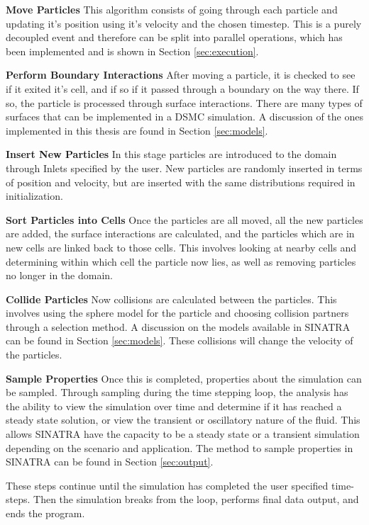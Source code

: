 \indent \textbf{Move Particles} This algorithm consists of going through each particle and updating it's position using it's velocity and the chosen timestep. This is a purely decoupled event and therefore can be split into parallel operations, which has been implemented and is shown in Section \ref{sec:execution}. \par

\indent \textbf{Perform Boundary Interactions} After moving a particle, it is checked to see if it exited it's cell, and if so if it passed through a boundary on the way there. If so, the particle is processed through surface interactions. There are many types of surfaces that can be implemented in a DSMC simulation. A discussion of the ones implemented in this thesis are found in Section \ref{sec:models}. \par

\indent \textbf{Insert New Particles} In this stage particles are introduced to the domain through Inlets specified by the user. New particles are randomly inserted in terms of position and velocity, but are inserted with the same distributions required in initialization. \par

\indent \textbf{Sort Particles into Cells} Once the particles are all moved, all the new particles are added, the surface interactions are calculated, and the particles which are in new cells are linked back to those cells. This involves looking at nearby cells and determining within which cell the particle now lies, as well as removing particles no longer in the domain. \par

\indent \textbf{Collide Particles} Now collisions are calculated between the particles. This involves using the sphere model for the particle and choosing collision partners through a selection method. A discussion on the models available in SINATRA can be found in Section \ref{sec:models}. These collisions will change the velocity of the particles. \par

\indent \textbf{Sample Properties} Once this is completed, properties about the simulation can be sampled. Through sampling during the time stepping loop, the analysis has the ability to view the simulation over time and determine if it has reached a steady state solution, or view the transient or oscillatory nature of the fluid. This allows SINATRA have the capacity to be a steady state or a transient simulation depending on the scenario and application. The method to sample properties in SINATRA can be found in Section \ref{sec:output}. \par

These steps continue until the simulation has completed the user specified time-steps. Then the simulation breaks from the loop, performs final data output, and ends the program. 




